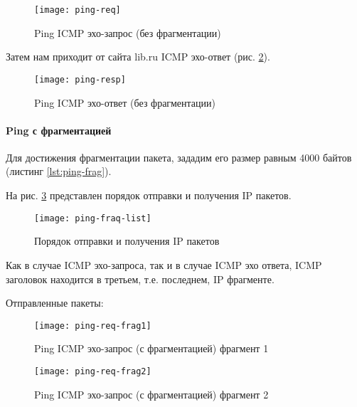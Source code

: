 

\begin{figure}[H]
	\centering
	\texttt{[image: ping-req]}
	\caption{Ping ICMP эхо-запрос (без фрагментации)}
	\label{fig:ping-req}
\end{figure}

Затем нам приходит от сайта lib.ru ICMP эхо-ответ (рис. \ref{fig:ping-resp}).

\begin{figure}[H]
	\centering
	\texttt{[image: ping-resp]}
	\caption{Ping ICMP эхо-ответ (без фрагментации)}
	\label{fig:ping-resp}
\end{figure}

\newpage

\paragraph{Ping с фрагментацией}

Для достижения фрагментации пакета, зададим его размер равным 4000 байтов (листинг \ref{lst:ping-frag}).



На рис. \ref{fig:ping-list} представлен порядок отправки и получения IP пакетов.

\begin{figure}[H]
	\centering
	\texttt{[image: ping-fraq-list]}
	\caption{Порядок отправки и получения IP пакетов}
	\label{fig:ping-list}
\end{figure}

Как в случае ICMP эхо-запроса, так и в случае ICMP эхо ответа, ICMP заголовок находится в третьем, т.е. последнем, IP фрагменте.

Отправленные пакеты:

\begin{figure}[H]
	\centering
	\texttt{[image: ping-req-frag1]}
	\caption{Ping ICMP эхо-запрос (с фрагментацией) фрагмент 1}
	\label{fig:ping-req-frag}
\end{figure}

\begin{figure}[H]
	\centering
	\texttt{[image: ping-req-frag2]}
	\caption{Ping ICMP эхо-запрос (с фрагментацией) фрагмент 2}
	\label{fig:ping-req-frag}
\end{figure}

